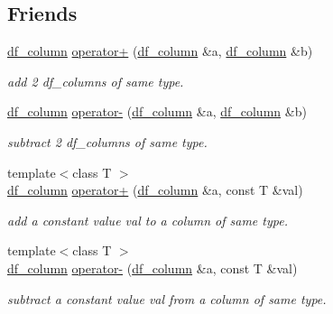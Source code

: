 \subsection*{Friends}
\begin{DoxyCompactItemize}
\item 
\hyperlink{classboost_1_1numeric_1_1ublas_1_1df__column}{df\+\_\+column} \hyperlink{classboost_1_1numeric_1_1ublas_1_1df__column_af49a160a88867a3857fa62054750742d}{operator+} (\hyperlink{classboost_1_1numeric_1_1ublas_1_1df__column}{df\+\_\+column} \&a, \hyperlink{classboost_1_1numeric_1_1ublas_1_1df__column}{df\+\_\+column} \&b)
\begin{DoxyCompactList}\small\item\em add 2 df\+\_\+columns of same type. \end{DoxyCompactList}\item 
\hyperlink{classboost_1_1numeric_1_1ublas_1_1df__column}{df\+\_\+column} \hyperlink{classboost_1_1numeric_1_1ublas_1_1df__column_a8bffb7e6810852b8f01d0794d85e0298}{operator-\/} (\hyperlink{classboost_1_1numeric_1_1ublas_1_1df__column}{df\+\_\+column} \&a, \hyperlink{classboost_1_1numeric_1_1ublas_1_1df__column}{df\+\_\+column} \&b)
\begin{DoxyCompactList}\small\item\em subtract 2 df\+\_\+columns of same type. \end{DoxyCompactList}\item 
{\footnotesize template$<$class T $>$ }\\\hyperlink{classboost_1_1numeric_1_1ublas_1_1df__column}{df\+\_\+column} \hyperlink{classboost_1_1numeric_1_1ublas_1_1df__column_a5a64459c6a2aa15589c8c729341d3760}{operator+} (\hyperlink{classboost_1_1numeric_1_1ublas_1_1df__column}{df\+\_\+column} \&a, const T \&val)
\begin{DoxyCompactList}\small\item\em add a constant value val to a column of same type. \end{DoxyCompactList}\item 
{\footnotesize template$<$class T $>$ }\\\hyperlink{classboost_1_1numeric_1_1ublas_1_1df__column}{df\+\_\+column} \hyperlink{classboost_1_1numeric_1_1ublas_1_1df__column_a6161de113fac68f0aa29fd02411ef024}{operator-\/} (\hyperlink{classboost_1_1numeric_1_1ublas_1_1df__column}{df\+\_\+column} \&a, const T \&val)
\begin{DoxyCompactList}\small\item\em subtract a constant value val from a column of same type. \end{DoxyCompactList}\item 

\end{DoxyCompactItemize}
